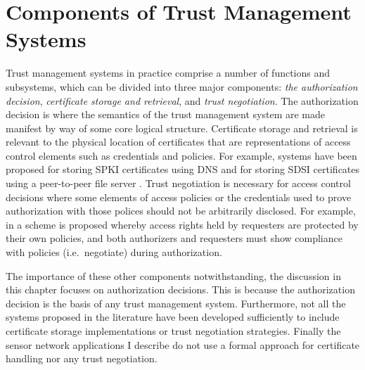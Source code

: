 \section{Components of Trust Management Systems}
\label{section-components}

Trust management systems in practice comprise a number of functions and subsystems, which can be
divided into three major components: \emph{the authorization decision}, \emph{certificate
  storage and retrieval}, and \emph{trust negotiation}. The authorization decision is where the
semantics of the trust management system are made manifest by way of some core logical
structure. Certificate storage and retrieval is relevant to the physical location of
certificates that are representations of access control elements such as credentials and
policies. For example, systems have been proposed for storing SPKI certificates using DNS
\cite{nikander98storing} and for storing SDSI certificates using a peer-to-peer file server
\cite{ajmani02conchord}. Trust negotiation
\cite{Winsborough:ATN,Yu:PECSATNI,Seamons:LDACPATN,Yu:ISATN,Winsborough:TPATN,Winsborough:SATN}
is necessary for access control decisions where some elements of access policies or the
credentials used to prove authorization with those polices should not be arbitrarily disclosed.
For example, in \cite{Winsborough:ATN} a scheme is proposed whereby access rights held by
requesters are protected by their own policies, and both authorizers and requesters must show
compliance with policies (i.e.~negotiate) during authorization.

The importance of these other components notwithstanding, the discussion in this chapter focuses
on authorization decisions. This is because the authorization decision is the basis of any trust
management system. Furthermore, not all the systems proposed in the literature have been
developed sufficiently to include certificate storage implementations or trust negotiation
strategies. Finally the sensor network applications I describe do not use a formal approach for
certificate handling nor any trust negotiation.


